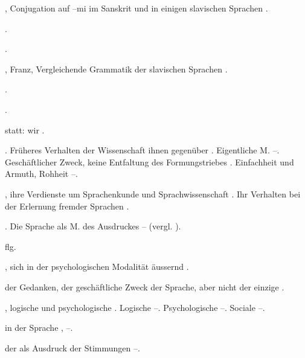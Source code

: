 \begin{register}
, Conjugation auf –mi im Sanskrit und in einigen slavischen Sprachen \pageref{sp.186}.

 \pageref{sp.257}.

 \pageref{sp.322}.

, Franz, Vergleichende Grammatik der slavischen Sprachen \pageref{sp.173}.

 \pageref{sp.163}.

 \pageref{sp.147}.


 statt: wir \pageref{sp.202}.


. Früheres Verhalten der Wissenschaft ihnen gegenüber \pageref{sp.158}. Eigentliche M. \pageref{sp.278}–\pageref{sp.283}. Geschäftlicher Zweck, keine Entfaltung des Formungstriebes \pageref{sp.366}. Einfachheit und Armuth, Rohheit \pageref{sp.406}–\pageref{sp.407}.

, ihre Verdienste um Sprachenkunde und Sprachwissenschaft \pageref{sp.25}. Ihr Verhalten bei der Erlernung fremder Sprachen \pageref{sp.68}.


. Die Sprache als M. des Ausdruckes \pageref{sp.84}–\pageref{sp.86} (vergl. ).


 \pageref{sp.318} flg.

, sich in der psychologischen Modalität äussernd \pageref{sp.473}.

 der Gedanken, der geschäftliche Zweck der Sprache, aber nicht der einzige \pageref{sp.362}.


, logische und psychologische \pageref{sp.103}. Logische \pageref{sp.470}–\pageref{sp.472}. Psychologische \pageref{sp.472}–\pageref{sp.474}. Sociale \pageref{sp.474}–\pageref{sp.475}.

 in der Sprache \pageref{sp.126}, \pageref{sp.249}–\pageref{sp.250}.

 der  als Ausdruck der Stimmungen \pageref{sp.376}–\pageref{sp.380}.


\end{register}
